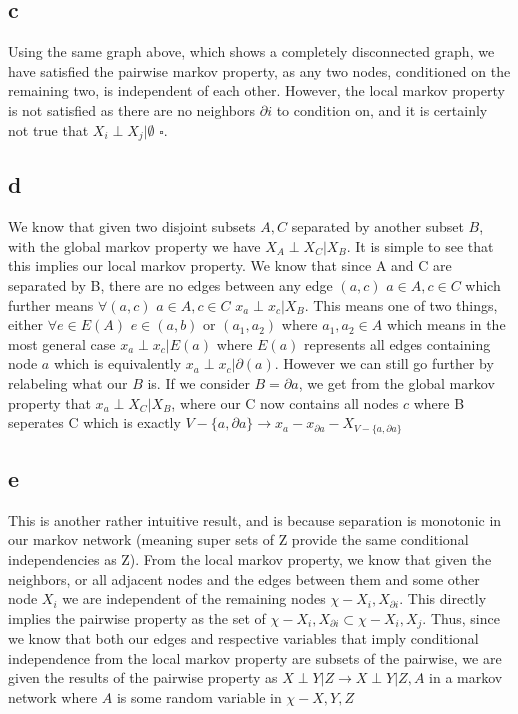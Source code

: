 \documentclass[12pt]{article}
\begin{document}
\subsection{c}

Using the same graph above, which shows a completely disconnected graph, we have satisfied the pairwise markov property, as any two nodes, conditioned on the remaining two, is independent of each other. However, the local markov property is not satisfied as there are no neighbors $\partial i$ to condition on, and it is certainly not true that $X_i \perp X_j | \emptyset$ $\square$.
\subsection{d}
We know that given two disjoint subsets $A,C$ separated by another subset $B$, with the global markov property  we have $X_A\perp X_C | X_B$. It is simple to see that this implies our local markov property. We know that since A and C are separated by B, there are no edges between any edge $(a,c)$ $a \in A, c\in C$ which further means $\forall (a,c)$ $a \in A, c\in C$ $x_a \perp x_c | X_B$. This means one of two things, either $\forall e \in E(A)$ $e\in (a,b)$ or $(a_1,a_2)$ where $a_1,a_2\in A$ which means in the most general case $x_a \perp x_c | E(a)$ where $E(a)$ represents all edges containing node $a$ which is equivalently $x_a\perp x_c | \partial(a)$. However we can still go further by relabeling what our $B$ is. If we consider $B=\partial a$, we get from the global markov property that $x_a\perp X_C | X_B$, where our C now contains all nodes $c$ where B seperates C which is exactly $V - \{a,\partial{a}\} \rightarrow x_a - x_{\partial a} - X_{V - \{a,\partial{a}\}}$
\subsection{e}
This is another rather intuitive result, and is because separation is monotonic in our markov network (meaning super sets of Z provide the same conditional independencies as Z). From the local markov property, we know that given the neighbors, or all adjacent nodes and the edges between them and some other node $X_i$ we are independent of the remaining nodes $\chi - {X_i, X_{\partial i}}$. This directly implies the pairwise property as the set of $\chi - {X_i, X_{\partial i}} \subset \chi - {X_i,X_j}$. Thus, since we know that both our edges and respective variables that imply conditional independence from the local markov property are subsets of the pairwise, we are given the results of the pairwise property as $X\perp Y | Z \rightarrow X\perp Y | Z,A$ in a markov network where $A$ is some random variable in $\chi - {X,Y,Z}$  
\end{document}
